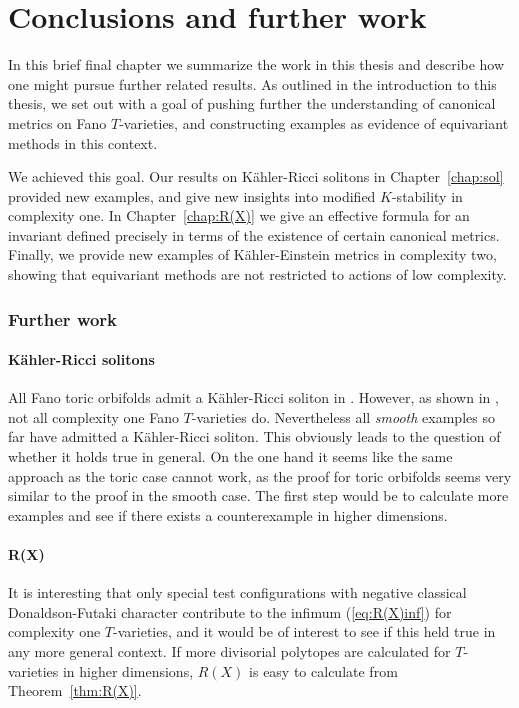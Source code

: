 \chapter{Conclusions and further work}

In this brief final chapter we summarize the work in this thesis and describe how one might pursue further related results. As outlined in the introduction to this thesis, we set out with a goal of pushing further the understanding of canonical metrics on Fano \(T\)-varieties, and constructing examples as evidence of equivariant methods in this context.

We achieved this goal. Our results on K\"ahler-Ricci solitons in Chapter~\ref{chap:sol} provided new examples, and give new insights into modified \(K\)-stability in complexity one. In Chapter~\ref{chap:R(X)} we give an effective formula for an invariant defined precisely in terms of the existence of certain canonical metrics. Finally, we provide new examples of K\"ahler-Einstein metrics in complexity two, showing that equivariant methods are not restricted to actions of low complexity.
\subsection*{Further work}
\subsubsection*{K\"ahler-Ricci solitons}
All Fano toric orbifolds admit a K\"ahler-Ricci soliton in \cite{shi2012kahler}. However, as shown in \cite{cable2018classification}, not all complexity one Fano \(T\)-varieties do. Nevertheless all \textit{smooth} examples so far have admitted a K\"ahler-Ricci soliton. This obviously leads to the question of whether it holds true in general. On the one hand it seems like the same approach as the toric case cannot work, as the proof for toric orbifolds seems very similar to the proof in the smooth case. The first step would be to calculate more examples and see if there exists a counterexample in higher dimensions.
\subsubsection*{R(X)}
It is interesting that only special test configurations with negative classical Donaldson-Futaki character contribute to the infimum (\ref{eq:R(X)inf}) for complexity one \(T\)-varieties, and it would be of interest to see if this held true in any more general context. If more divisorial polytopes are calculated for \(T\)-varieties in higher dimensions, \(R(X)\) is easy to calculate from Theorem~\ref{thm:R(X)}.

